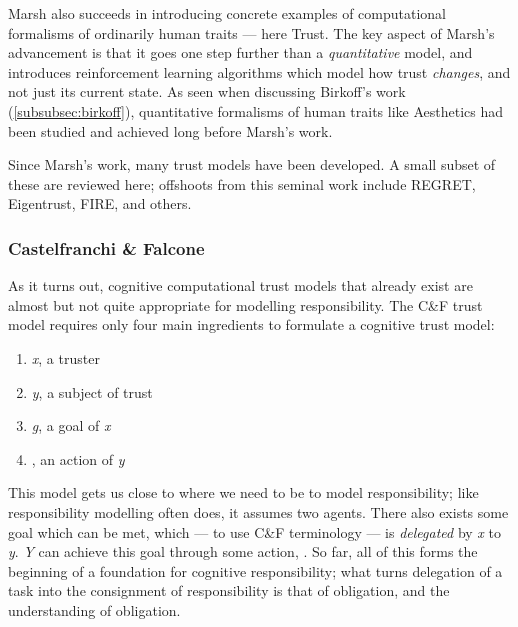 Marsh also succeeds in introducing concrete examples of computational formalisms of ordinarily human traits --- here Trust. The key aspect of Marsh's advancement is that it goes one step further than a \emph{quantitative} model, and introduces reinforcement learning algorithms which model how trust \emph{changes}, and not just its current state. As seen when discussing Birkoff's work (\cref{subsubsec:birkoff}), quantitative formalisms of human traits like Aesthetics had been studied and achieved long before Marsh's work.\par

Since Marsh's work, many trust models have been developed. A small subset of these are reviewed here; offshoots from this seminal work include REGRET, Eigentrust, FIRE, and others.\par


\subsubsection{Castelfranchi \& Falcone}
As it turns out, cognitive computational trust models that already exist are almost but not quite appropriate for modelling responsibility. The C\&F trust model requires only four main ingredients to formulate a cognitive trust model:

\begin{enumerate}
    \item \emph{x}, a truster
    \item \emph{y}, a subject of trust
    \item \emph{g}, a goal of \emph{x}
    \item \emph{\safealpha}, an action of \emph{y}
\end{enumerate}\par

This model gets us close to where we need to be to model responsibility; like responsibility modelling often does, it assumes two agents. There also exists some goal which can be met, which --- to use C\&F terminology --- is \emph{delegated} by \emph{x} to \emph{y}. \emph{Y} can achieve this goal through some action, \emph{\safealpha}. So far, all of this forms the beginning of a foundation for cognitive responsibility; what turns delegation of a task into the consignment of responsibility is that of obligation, and the understanding of obligation. \par

